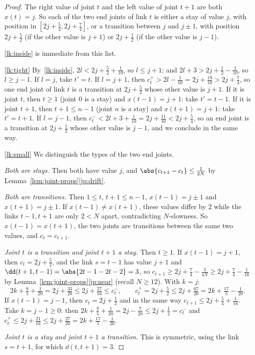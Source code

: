 \begin{proof}
The right value of joint $t$ and the left value of joint $t+1$ are both $x(t)=j$. So each of the
two end joints of link $t$ is either a stay of value $j$, with position in
$[2j+\frac54,2j+\frac74]$, or a transition between $j$ and $j\pm1$, with position $2j+\frac52$
(if the other value is $j+1$) or $2j+\frac12$ (if the other value is $j-1$).

\ref{lk:inside} is immediate from this list.

\ref{lk:tight} By~\ref{lk:inside}, $2l<2j+\frac52+\frac1{10}$, so $l\le j+1$; and $2l+3>2j+\frac12-
\frac1{10}$, so $l\ge j-1$. If $l=j$, take $t'=t$. If $l=j+1$, then $c_t^+>2l-\frac1{10}=2j+\frac{19}{10}
>2j+\frac74$, so one end joint of link $t$ is a transition at $2j+\frac52$ whose other value is
$j+1$. If it is joint $t$, then $t\ge1$ (joint $0$ is a stay) and $x(t-1)=j+1$: take $t'=t-1$. If it
is joint $t+1$, then $t+1\le n-1$ (joint $n$ is a stay) and $x(t+1)=j+1$: take $t'=t+1$. If $l=j-1$,
then $c_t^-<2l+3+\frac1{10}=2j+\frac{11}{10}<2j+\frac54$, so an end joint is a transition at
$2j+\frac12$ whose other value is $j-1$, and we conclude in the same way.

\ref{lk:small} We distinguish the types of the two end joints.

\emph{Both are stays.} Then both have value $j$, and $\abs{c_{t+1}-c_t}\le\frac1{2N}$ by
Lemma~\ref{lem:joint-props}\ref{jp:drift}.

\emph{Both are transitions.} Then $1\le t$, $t+1\le n-1$, $x(t-1)=j\pm1$ and $x(t+1)=j\pm1$. If
$x(t-1)\neq x(t+1)$, these values differ by $2$ while the links $t-1,t+1$ are only $2<N$ apart,
contradicting $N$-slowness. So $x(t-1)=x(t+1)$, the two joints are transitions between the same
two values, and $c_t=c_{t+1}$.

\emph{Joint $t$ is a transition and joint $t+1$ a stay.} Then $t\ge1$. If $x(t-1)=j+1$, then
$c_t=2j+\frac52$, and the link $s=t-1$ has value $j+1$ and $\dd(t+1,t-1)=\abs{2t-1-2t-2}=3$, so
$c_{t+1}\ge2j+\frac74-\frac3{4N}\ge2j+\frac74-\frac1{16}$ by
Lemma~\ref{lem:joint-props}\ref{jp:near} (recall $N\ge12$). With $k=j$:
\[
2k+\tfrac85+\tfrac1{20}=2j+\tfrac{33}{20}\le2j+\tfrac{27}{16}\le c_t^-,\qquad
c_t^+=2j+\tfrac52\le2j+\tfrac{67}{20}=2k+\tfrac{17}5-\tfrac1{20}.
\]
If $x(t-1)=j-1$, then $c_t=2j+\frac12$ and in the same way $c_{t+1}\le2j+\frac54+\frac1{16}$. Take
$k=j-1\ge0$: then $2k+\frac85+\frac1{20}=2j-\frac{7}{20}\le2j+\frac12=c_t^-$ and
$c_t^+\le2j+\frac{21}{16}\le2j+\frac{27}{20}=2k+\frac{17}5-\frac1{20}$.

\emph{Joint $t$ is a stay and joint $t+1$ a transition.} This is symmetric, using the link
$s=t+1$, for which $\dd(t,t+1)=3$.
\end{proof}

